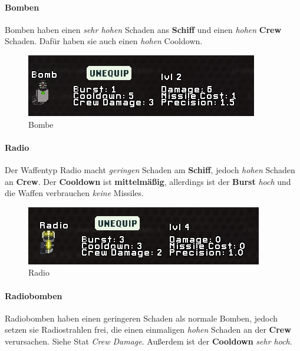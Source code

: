 \documentclass[fontsize=12pt,paper=a4,twoside]{scrartcl}
\begin{document}
\paragraph{Bomben}

Bomben haben einen \textit{sehr hohen} Schaden ans \textbf{Schiff} und einen \textit{hohen} \textbf{Crew} Schaden. Dafür haben sie auch einen \textit{hohen} Cooldown. 

\begin{figure}[H]
\centering
\includegraphics[width=1\linewidth]{DasSpiel/Kampf/waffen/bomb.png}
\caption{Bombe}
\end{figure}

\paragraph{Radio}

Der Waffentyp Radio macht \textit{geringen} Schaden am \textbf{Schiff}, jedoch \textit{hohen} Schaden an \textbf{Crew}. Der \textbf{Cooldown} ist \textbf{mittelmäßig}, allerdings ist der \textbf{Burst} \textit{hoch} und die Waffen verbrauchen \textit{keine} Missiles. 

\begin{figure}[H]
\centering
\includegraphics[width=1\linewidth]{DasSpiel/Kampf/waffen/radio.png}
\caption{Radio}
\end{figure}

\paragraph{Radiobomben}

Radiobomben haben einen geringeren Schaden als normale Bomben, jedoch setzen sie Radiostrahlen frei, die einen einmaligen \textit{hohen} Schaden an der \textbf{Crew} verursachen. Siehe Stat \textit{Crew Damage}. Außerdem ist der \textbf{Cooldown} \textit{sehr hoch}. 
\end{document}
